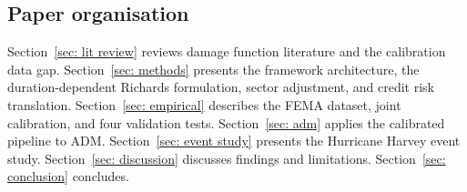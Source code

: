 \subsection{Paper organisation}

Section~\ref{sec: lit review} reviews damage function literature and the calibration data gap. Section~\ref{sec: methods} presents the framework architecture, the duration-dependent Richards formulation, sector adjustment, and credit risk translation. Section~\ref{sec: empirical} describes the FEMA dataset, joint calibration, and four validation tests. Section~\ref{sec: adm} applies the calibrated pipeline to ADM. Section~\ref{sec: event study} presents the Hurricane Harvey event study. Section~\ref{sec: discussion} discusses findings and limitations. Section~\ref{sec: conclusion} concludes.
